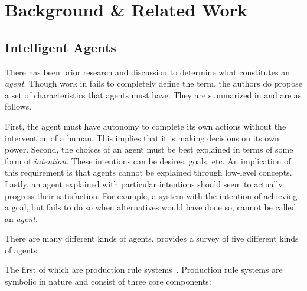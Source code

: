 \chapter{Background \& Related Work}
\label{ch:background}

%
%
%

\section{Intelligent Agents}
\label{sec:agents}

There has been prior research and discussion to determine what constitutes an \textit{agent}.
Though work in \cite{wooldridge_agent_1995} fails to completely define the term,
the authors do propose a set of characteristics that agents must have.
They are summarized in \cite{dignum_intentional_1998} and are as follows.

First, the agent must have autonomy to complete its own actions without the intervention of a human.
This implies that it is making decisions on its own power.
Second, the choices of an agent must be best explained in terms of some form of \textit{intention}.
These intentions can be desires, goals, etc.
An implication of this requirement is that agents cannot be explained through low-level concepts.
Lastly, an agent explained with particular intentions should seem to actually progress their satisfaction.
For example, a system with the intention of achieving a goal,
but fails to do so when alternatives would have done so, cannot be called an \textit{agent}.

There are many different kinds of agents.
\cite{balke_how_2014} provides a survey of five different kinds of agents.

The first of which are production rule systems~\cite{balke_how_2014}.
Production rule systems are symbolic in nature and
consist of three core components:


